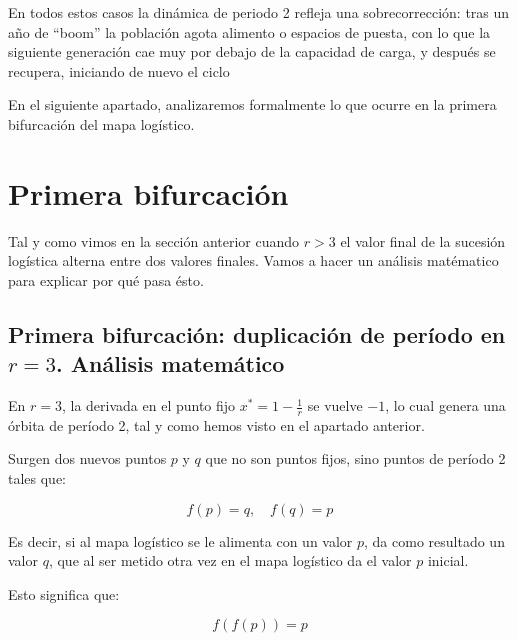 \documentclass[
  10pt,
  a4paper,
  DIV=11,
  numbers=noendperiod,
  open=any]{scrreprt}
\numberwithin{equation}{chapter}
\numberwithin{equation}{chapter}
\renewcommand{\[}{\begin{equation}}
\renewcommand{\]}{\end{equation}}
\begin{document}
En todos estos casos la dinámica de periodo 2 refleja una
sobrecorrección: tras un año de ``boom'' la población agota alimento o
espacios de puesta, con lo que la siguiente generación cae muy por
debajo de la capacidad de carga, y después se recupera, iniciando de
nuevo el ciclo

En el siguiente apartado, analizaremos formalmente lo que ocurre en la
primera bifurcación del mapa logístico.


\chapter{Primera bifurcación}\label{primera-bifurcaciuxf3n}

Tal y como vimos en la sección anterior cuando \(r > 3\) el valor final
de la sucesión logística alterna entre dos valores finales. Vamos a
hacer un análisis matématico para explicar por qué pasa ésto.

\section{\texorpdfstring{Primera bifurcación: duplicación de período en
\(r = 3\). Análisis
matemático}{Primera bifurcación: duplicación de período en r = 3. Análisis matemático}}\label{primera-bifurcaciuxf3n-duplicaciuxf3n-de-peruxedodo-en-r-3.-anuxe1lisis-matemuxe1tico}

En \(r = 3\), la derivada en el punto fijo \(x^* = 1 - \frac{1}{r}\) se
vuelve \(-1\), lo cual genera una órbita de período 2, tal y como hemos
visto en el apartado anterior.

Surgen dos nuevos puntos \(p\) y \(q\) que no son puntos fijos, sino
puntos de período 2 tales que:

\begin{equation}

f(p) = q, \quad f(q) = p

\end{equation}

Es decir, si al mapa logístico se le alimenta con un valor \(p\), da
como resultado un valor \(q\), que al ser metido otra vez en el mapa
logístico da el valor \(p\) inicial.

Esto significa que:

\begin{equation}

f(f(p)) = p

\end{equation}
\end{document}
